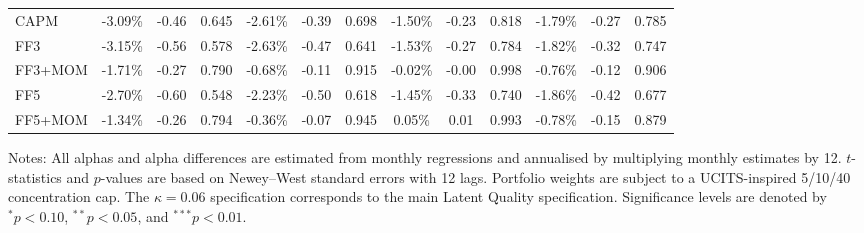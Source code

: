 \begin{table}[H]
\begin{threeparttable}
\begin{tabular*}{\textwidth}{@{\extracolsep{\fill}}lcccccccccccc}
\midrule
CAPM      & -3.09\% & -0.46 & 0.645 & -2.61\% & -0.39 & 0.698 & -1.50\% & -0.23 & 0.818 & -1.79\% & -0.27 & 0.785 \\
FF3       & -3.15\% & -0.56 & 0.578 & -2.63\% & -0.47 & 0.641 & -1.53\% & -0.27 & 0.784 & -1.82\% & -0.32 & 0.747 \\
FF3+MOM   & -1.71\% & -0.27 & 0.790 & -0.68\% & -0.11 & 0.915 & -0.02\% & -0.00 & 0.998 & -0.76\% & -0.12 & 0.906 \\
FF5       & -2.70\% & -0.60 & 0.548 & -2.23\% & -0.50 & 0.618 & -1.45\% & -0.33 & 0.740 & -1.86\% & -0.42 & 0.677 \\
FF5+MOM   & -1.34\% & -0.26 & 0.794 & -0.36\% & -0.07 & 0.945 & 0.05\% & 0.01 & 0.993 & -0.78\% & -0.15 & 0.879 \\
\bottomrule
\end{tabular*}
\begin{tablenotes}[flushleft]
\footnotesize
\item Notes: All alphas and alpha differences are estimated from monthly regressions and annualised by multiplying monthly estimates by 12. $t$-statistics and $p$-values are based on Newey--West standard errors with 12 lags. Portfolio weights are subject to a UCITS-inspired 5/10/40 concentration cap. The $\kappa=0.06$ specification corresponds to the main Latent Quality specification. Significance levels are denoted by $^{*} p<0.10$, $^{**} p<0.05$, and $^{***} p<0.01$.
\end{tablenotes}
\end{threeparttable}
\end{table}
